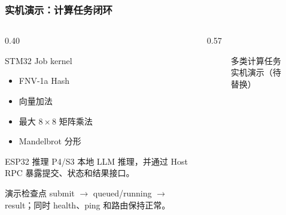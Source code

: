 \documentclass[aspectratio=169]{ctexbeamer}
\begin{document}
\begin{frame}
  \frametitle{实机演示：计算任务闭环}
  \begin{columns}[T]
    \begin{column}{0.40\textwidth}
      \begin{block}{STM32 Job kernel}
        \small
        \begin{itemize}
          \item FNV-1a Hash
          \item 向量加法
          \item 最大 $8\times8$ 矩阵乘法
          \item Mandelbrot 分形
        \end{itemize}
      \end{block}
      \begin{block}{ESP32 推理}
        \small
        P4/S3 本地 LLM 推理，并通过 Host RPC 暴露提交、状态和结果接口。
      \end{block}
      \begin{alertblock}{演示检查点}
        \small
        submit $\rightarrow$ queued/running $\rightarrow$ result；同时 health、ping 和路由保持正常。
      \end{alertblock}
    \end{column}
    \begin{column}{0.57\textwidth}
      \begin{figure}
        \centering
        \caption{多类计算任务实机演示（待替换）}
      \end{figure}
    \end{column}
  \end{columns}
\end{frame}
\end{document}
